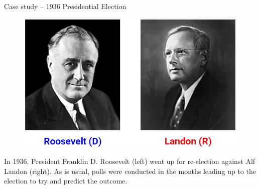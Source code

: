 \documentclass[aspectratio=169]{../latex_main/tntbeamer}  %
\begin{document}
	\begin{frame}{Case study – 1936 Presidential Election}
	  \begin{figure}
	      \centering
	      \includegraphics[scale=.4]{Bild11}
	  \end{figure}
	  In 1936, President Franklin D. Roosevelt (left) went up for re-election against Alf Landon (right). As is usual, polls were conducted in the months leading up to the election to try and predict the outcome.

	\end{frame}
	
\end{document}
